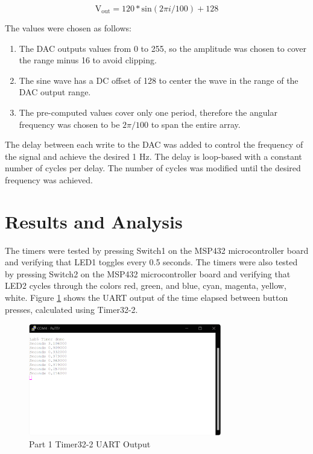 \documentclass[CMPE]{KGCOEReport}
\begin{document}
\begin{equation}
\text{V}_\text{out} = 120 * \text{sin}(2\pi i / 100) + 128
\label{eq:dacEq}
\end{equation}

The values were chosen as follows:

\begin{enumerate}
    \item The DAC outputs values from 0 to 255, so the amplitude was chosen to cover the range minus 16 to avoid clipping.
    \item The sine wave has a DC offset of 128 to center the wave in the range of the DAC output range.
    \item The pre-computed values cover only one period, therefore the angular frequency was chosen to be $2\pi / 100$ to span the entire array.
\end{enumerate}

The delay between each write to the DAC was added to control the frequency of the signal and achieve the desired 1 Hz. The delay is loop-based with a constant number of cycles per delay. The number of cycles was modified until the desired frequency was achieved.


\section*{Results and Analysis}


The timers were tested by pressing Switch1 on the MSP432 microcontroller board and verifying that LED1 toggles every 0.5 seconds. The timers were also tested by pressing Switch2 on the MSP432 microcontroller board and verifying that LED2 cycles through the colors red, green, and blue, cyan, magenta, yellow, white. Figure \ref{fig:part1} shows the UART output of the time elapsed between button presses, calculated using Timer32-2.

\begin{figure}[H]
    \centering
    \includegraphics[width=0.75\textwidth]{part1.png}
    \caption{Part 1 Timer32-2 UART Output}
    \label{fig:part1}
\end{figure}
\end{document}

